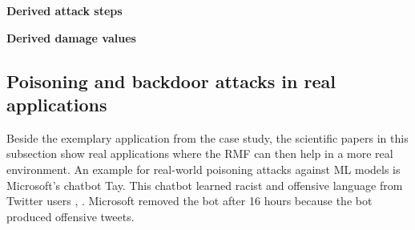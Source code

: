 \textbf{Derived attack steps}

\textbf{Derived damage values}

\subsection{Poisoning and backdoor attacks in real applications}

Beside the exemplary application from the case study, the scientific papers in this subsection show real applications where the RMF can then help in a more real environment. An example for real-world poisoning attacks against ML models is Microsoft's chatbot Tay. This chatbot learned racist and offensive language from Twitter users \cite{DBLP:conf/iciot/BaracaldoCLSZ18}, \cite{DBLP:conf/ccs/BaracaldoCLS17}. Microsoft removed the bot after 16 hours because the bot produced offensive tweets.
